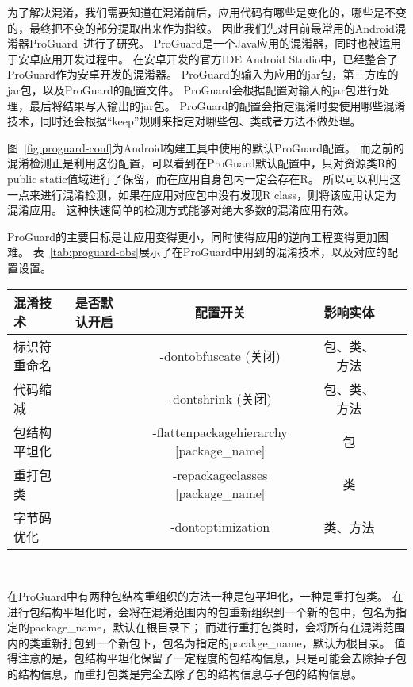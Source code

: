 为了解决混淆，我们需要知道在混淆前后，应用代码有哪些是变化的，哪些是不变的，最终把不变的部分提取出来作为指纹。
因此我们先对目前最常用的Android混淆器ProGuard~\supercite{proguard}进行了研究。
ProGuard是一个Java应用的混淆器，同时也被运用于安卓应用开发过程中。
在安卓开发的官方IDE Android Studio中，已经整合了ProGuard作为安卓开发的混淆器。
ProGuard的输入为应用的jar包，第三方库的jar包，以及ProGuard的配置文件。
ProGuard会根据配置对输入的jar包进行处理，最后将结果写入输出的jar包。
ProGuard的配置会指定混淆时要使用哪些混淆技术，同时还会根据“keep”规则来指定对哪些包、类或者方法不做处理。


图~\ref{fig:proguard-conf}为Android构建工具中使用的默认ProGuard配置。
而之前的混淆检测正是利用这份配置，可以看到在ProGuard默认配置中，只对资源类R的public static值域进行了保留，而在应用自身包内一定会存在R。
所以可以利用这一点来进行混淆检测，如果在应用对应包中没有发现R class，则将该应用认定为混淆应用。
这种快速简单的检测方式能够对绝大多数的混淆应用有效。

ProGuard的主要目标是让应用变得更小，同时使得应用的逆向工程变得更加困难。
表~\ref{tab:proguard-obs}展示了在ProGuard中用到的混淆技术，以及对应的配置设置。

\begin{table}[!hpb]
	\centering
	\begin{tabularx}{\textwidth}{|X|c|c|c|X|X}
		\hline
		混淆技术 & 是否默认开启 & 配置开关 & 影响实体\\
		\hline
		标识符重命名 & \cmark & -dontobfuscate (关闭) & 包、类、方法\\
		\hline
		代码缩减 & \cmark & -dontshrink (关闭) & 包、类、方法\\
		\hline
		包结构平坦化 & \xmark & -flattenpackagehierarchy [package\_name] & 包\\
		\hline
		重打包类 & \xmark & -repackageclasses [package\_name] & 类\\
		\hline
		字节码优化 & \xmark & -dontoptimization & 类、方法\\
		\hline
	\end{tabularx}\\
\end{table}

在ProGuard中有两种包结构重组织的方法一种是包平坦化，一种是重打包类。
在进行包结构平坦化时，会将在混淆范围内的包重新组织到一个新的包中，包名为指定的package\_name，默认在根目录下；
而进行重打包类时，会将所有在混淆范围内的类重新打包到一个新包下，包名为指定的pacakge\_name，默认为根目录。
值得注意的是，包结构平坦化保留了一定程度的包结构信息，只是可能会去除掉子包的结构信息，而重打包类是完全去除了包的结构信息与子包的结构信息。

